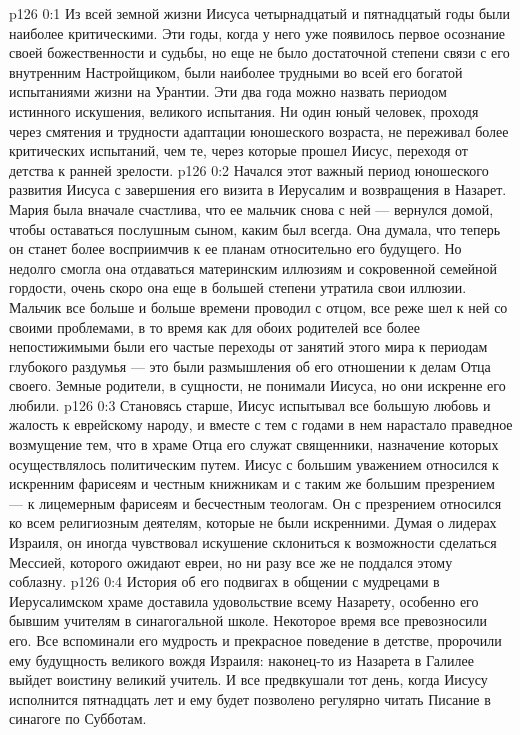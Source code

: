 \author{Комиссия срединников}
\vs p126 0:1 Из всей земной жизни Иисуса четырнадцатый и пятнадцатый годы были наиболее критическими. Эти годы, когда у него уже появилось первое осознание своей божественности и судьбы, но еще не было достаточной степени связи с его внутренним Настройщиком, были наиболее трудными во всей его богатой испытаниями жизни на Урантии. Эти два года можно назвать периодом истинного искушения, великого испытания. Ни один юный человек, проходя через смятения и трудности адаптации юношеского возраста, не переживал более критических испытаний, чем те, через которые прошел Иисус, переходя от детства к ранней зрелости.
\vs p126 0:2 Начался этот важный период юношеского развития Иисуса с завершения его визита в Иерусалим и возвращения в Назарет. Мария была вначале счастлива, что ее мальчик снова с ней --- вернулся домой, чтобы оставаться послушным сыном, каким был всегда. Она думала, что теперь он станет более восприимчив к ее планам относительно его будущего. Но недолго смогла она отдаваться материнским иллюзиям и сокровенной семейной гордости, очень скоро она еще в большей степени утратила свои иллюзии. Мальчик все больше и больше времени проводил с отцом, все реже шел к ней со своими проблемами, в то время как для обоих родителей все более непостижимыми были его частые переходы от занятий этого мира к периодам глубокого раздумья --- это были размышления об его отношении к делам Отца своего. Земные родители, в сущности, не понимали Иисуса, но они искренне его любили.
\vs p126 0:3 \pc Становясь старше, Иисус испытывал все большую любовь и жалость к еврейскому народу, и вместе с тем с годами в нем нарастало праведное возмущение тем, что в храме Отца его служат священники, назначение которых осуществлялось политическим путем. Иисус с большим уважением относился к искренним фарисеям и честным книжникам и с таким же большим презрением --- к лицемерным фарисеям и бесчестным теологам. Он с презрением относился ко всем религиозным деятелям, которые не были искренними. Думая о лидерах Израиля, он иногда чувствовал искушение склониться к возможности сделаться Мессией, которого ожидают евреи, но ни разу все же не поддался этому соблазну.
\vs p126 0:4 \pc История об его подвигах в общении с мудрецами в Иерусалимском храме доставила удовольствие всему Назарету, особенно его бывшим учителям в синагогальной школе. Некоторое время все превозносили его. Все вспоминали его мудрость и прекрасное поведение в детстве, пророчили ему будущность великого вождя Израиля: наконец\hyp{}то из Назарета в Галилее выйдет воистину великий учитель. И все предвкушали тот день, когда Иисусу исполнится пятнадцать лет и ему будет позволено регулярно читать Писание в синагоге по Субботам.
